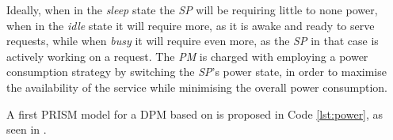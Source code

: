   Ideally, when in the \textit{sleep} state the \textit{SP} will be requiring little to none power, when in the \textit{idle} state it will require more, as it is awake and ready to serve requests, while when \textit{busy} it will require even more, as the \textit{SP} in that case is actively working on a request. The \textit{PM} is charged with employing a power consumption strategy by switching the \textit{SP}'s power state, in order to maximise the availability of the service while minimising the overall power consumption.
  
  A first PRISM model for a DPM based on \cite{qiu2001stochastic} is proposed in Code \ref{lst:power}, as seen in \cite{prism-tutorial3}.
  
  \begin{center}
    
  \end{center}
